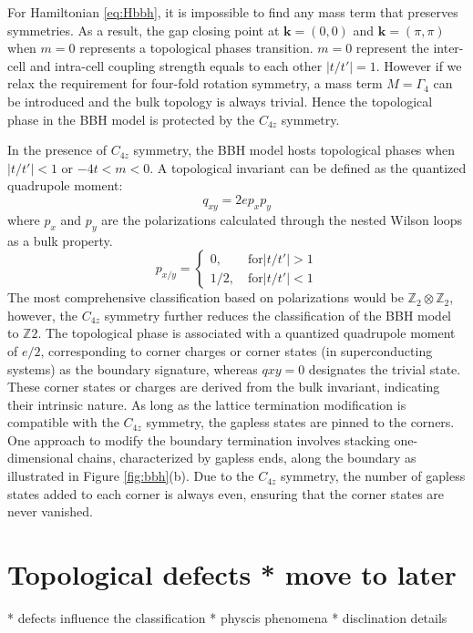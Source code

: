 For Hamiltonian \ref{eq:Hbbh}, it is impossible to find any mass term that preserves symmetries. As a result, the gap closing point at $\mathbf{k}=(0,0)$ and $\mathbf{k} = (\pi, \pi)$ when $m=0$ represents a topological phases transition. $m=0$ represent the inter-cell and intra-cell coupling strength equals to each other $|t/t'|=1$. However if we relax the requirement for four-fold rotation symmetry, a mass term $M=\Gamma_4$ can be introduced and the bulk topology is always trivial. Hence the topological phase in the BBH model is protected by the $C_{4z}$ symmetry. 

In the presence of $C_{4z}$ symmetry, the BBH model hosts topological phases when $|t/t'|<1$ or $-4t<m<0$. A topological invariant can be defined as the quantized quadrupole moment:
\begin{equation}
    q_{xy} = 2ep_xp_y
\end{equation}
where $p_x$ and $p_y$ are the polarizations calculated through the nested Wilson loops as a bulk property.
\begin{equation}
    p_{x/y} = \begin{cases}
        0, \quad\quad \text{for} |t/t'|>1\\
        1/2,\quad\text{for} |t/t'|<1
    \end{cases}
\end{equation}
The most comprehensive classification based on polarizations would be $\mathbb{Z}_2\otimes\mathbb{Z}_2$, however, the $C_{4z}$ symmetry further reduces the classification of the BBH model to $\mathbb{Z}2$. The topological phase is associated with a quantized quadrupole moment of $e/2$, corresponding to corner charges or corner states (in superconducting systems) as the boundary signature, whereas $q{xy}=0$ designates the trivial state. These corner states or charges are derived from the bulk invariant, indicating their intrinsic nature. As long as the lattice termination modification is compatible with the $C_{4z}$ symmetry, the gapless states are pinned to the corners. One approach to modify the boundary termination involves stacking one-dimensional chains, characterized by gapless ends, along the boundary as illustrated in Figure \ref{fig:bbh}(b). Due to the $C_{4z}$ symmetry, the number of gapless states added to each corner is always even, ensuring that the corner states are never vanished.

\section{Topological defects * move to later}
* defects influence the classification
* physcis phenomena
* disclination details
